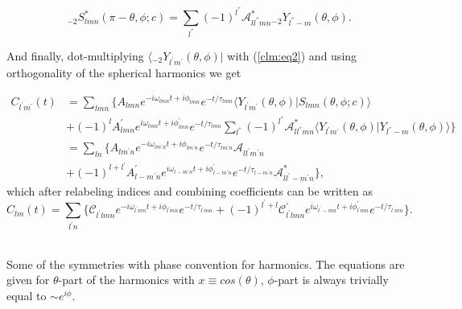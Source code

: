 \documentclass[11pt]{article}
\newcommand{\bra}[1]{\langle #1|}
\newcommand{\braket}[2]{\langle #1|#2\rangle}
\begin{document}
\begin{equation} \label{SlmnStar:expan}
{}_{\minus 2}S^{*}_{lmn}(\pi - \theta, \phi ;c) = \sum_{l^{''}} (-1)^{l^{''}}\mathcal{A}^{*}_{ll^{''}mn} {}_{\minus 2}Y_{l^{''}-m}(\theta, \phi).
\end{equation}

\noindent
And finally, dot-multiplying $\bra{{}_{\minus 2}Y_{l^{'}m^{'}}(\theta, \phi)}$ with (\ref{clm:eq2}) and using orthogonality of the spherical harmonics we get

\begin{equation}
\begin{aligned} \label{clm:eq3}
C_{l^{'}m^{'}}(t) & = \sum_{lmn} \Big\{ A_{lmn} e^{-i\omega_{lmn}t+i\phi_{lmn}}e^{-t/\tau_{lmn}} \braket{Y_{l^{'}m^{'}}(\theta, \phi)}{S_{lmn}(\theta, \phi ;c)}\\
& + (-1)^lA^{'}_{lmn} e^{i\omega_{lmn}t+i\phi^{'}_{lmn}}e^{-t/\tau_{lmn}} \sum_{l^{''}} (-1)^{l^{''}} \mathcal{A}^{*}_{ll^{''}mn} \braket{Y_{l^{'}m^{'}}(\theta, \phi)}{Y_{l^{''}-m}(\theta, \phi)} \Big\}\\
& = \sum_{ln} \Big\{ A_{lm^{'}n} e^{-i\omega_{lm^{'}n}t+i\phi_{lm^{'}n}}e^{-t/\tau_{lm^{'}n}} \mathcal{A}_{ll^{'}m^{'}n}\\
& + (-1)^{l + l^{'}} A^{'}_{l-m^{'}n} e^{i\omega_{l-m^{'}n}t+i\phi^{'}_{l-m^{'}n}}e^{-t/\tau_{l-m^{'}n}} \mathcal{A}^{*}_{ll^{'}-m^{'}n}  \Big\},
\end{aligned}
\end{equation}
which after relabeling indices and combining coefficients can be written as 
\begin{equation}
C_{lm}(t) = \sum_{l^{'}n} \Big\{ \mathcal{C}_{l^{'}lmn} e^{-i\omega_{l^{'}mn}t+i\phi_{l^{'}mn}}e^{-t/\tau_{l^{'}mn}} + (-1)^{l^{'}+l} \mathcal{C}^{'}_{l^{'}lmn} e^{i\omega_{l^{'}-mn}t+i\phi^{'}_{l^{'}mn}}e^{-t/\tau_{l^{'}mn}} \Big\}.
\end{equation}


 \\

\noindent
Some of the symmetries with phase convention for harmonics. The equations are given for $\theta$-part of the harmonics with $x \equiv cos(\theta)$, $\phi$-part is always trivially equal to $\sim e^{i\phi}$.\\
\end{document}
